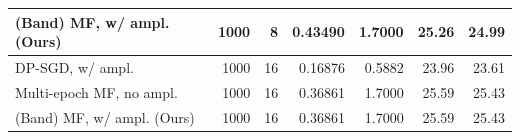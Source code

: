 \begin{tabular}{lrrrrrr}
 (Band) MF, w/ ampl. (Ours) &           1000 &          8 &          0.43490 &             1.7000 &                             25.26 &             24.99 \\
\midrule
           DP-SGD, w/ ampl. &           1000 &         16 &          0.16876 &             0.5882 &                             23.96 &             23.61 \\
   Multi-epoch MF, no ampl. &           1000 &         16 &          0.36861 &             1.7000 &                             25.59 &             25.43 \\
 (Band) MF, w/ ampl. (Ours) &           1000 &         16 &          0.36861 &             1.7000 &                             25.59 &             25.43 \\
\bottomrule
\end{tabular}
